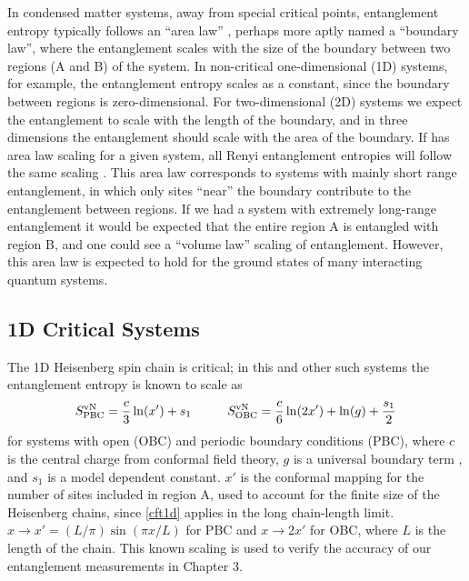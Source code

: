 In condensed matter systems, away from special critical points, entanglement entropy typically follows an ``area law'' \cite{Shredder, ALreview}, perhaps more aptly named a ``boundary law'', where the entanglement scales with the size of the boundary between two regions (A and B) of the system.
In non-critical one-dimensional (1D) systems, for example, the entanglement entropy scales as a constant, since the boundary between regions is zero-dimensional.
For two-dimensional (2D) systems we expect the entanglement to scale with the length of the boundary, and in three dimensions the entanglement should scale with the area of the boundary.
If \vn has area law scaling for a given system, all Renyi entanglement entropies will follow the same scaling \cite{Bbob}.
This area law corresponds to systems with mainly short range entanglement, in which only sites ``near'' the boundary contribute to the entanglement between regions.  
If we had a system with extremely long-range entanglement it would be expected that the entire region A is entangled with region B, and one could see a ``volume law'' scaling of entanglement. 
However, this area law is expected to hold for the ground states of many interacting quantum systems.



\subsection{1D Critical Systems}
\label{1dcft}

The 1D Heisenberg spin chain is critical; in this and other such systems the entanglement entropy is known to scale as \cite{Cardy, Ian1, Zhou2006}
\begin{equation} \label{cft1d} 
	S^{\text{vN}}_{\text{PBC}} = \frac{c}{3}\ln(x') + s_1
	\hspace{1cm}
	S^{\text{vN}}_{\text{OBC}} = \frac{c}{6}\ln(2x') + \ln(g)+ \frac{s_1}{2}
\end{equation}
for systems with open (OBC) and periodic boundary conditions (PBC), where $c$ is the central charge from conformal field theory, $g$ is a universal boundary term \cite{AffleckAndLudwig}, and $s_1$ is a model dependent constant. $x'$ is the conformal mapping for the number of sites included in region A, used to account for the finite size of the Heisenberg chains, since \eqref{cft1d} applies in the long chain-length limit.  $x \rightarrow x' = (L/\pi)\sin(\pi x/L)$ for PBC and $x \rightarrow 2x'$ for OBC, where $L$ is the length of the chain.
This known scaling is used to verify the accuracy of our entanglement measurements in Chapter 3.

